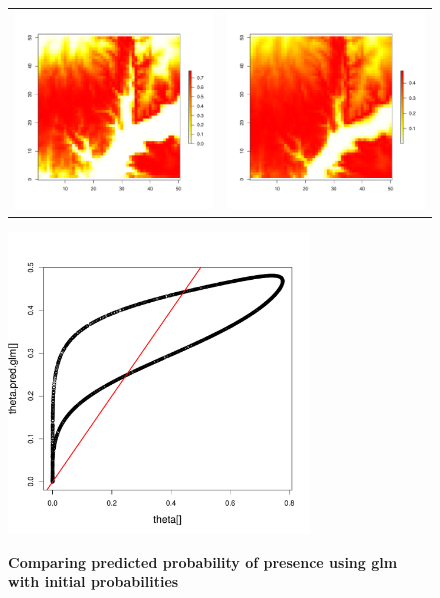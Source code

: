 \documentclass[a4paper, 12pt, leqno]{article}\usepackage[]{graphicx}\usepackage[]{color}
\begin{document}
\begin{figure}[!h] 
  \begin{tabular}{cc}
    \includegraphics[width=8cm]{figures/theta-binomial.pdf} &
    \includegraphics[width=8cm]{figures/predictions-siteocc-glm.pdf} \\
  \end{tabular}
  \centering \includegraphics[width=8cm]{figures/pred-obs-siteocc-glm.pdf} \\
  
  \caption{\textbf{Comparing predicted probability of presence using glm with initial probabilities}}
  
  \label{fig:predictions-siteocc-glm}
  
\end{figure}
\end{document}
